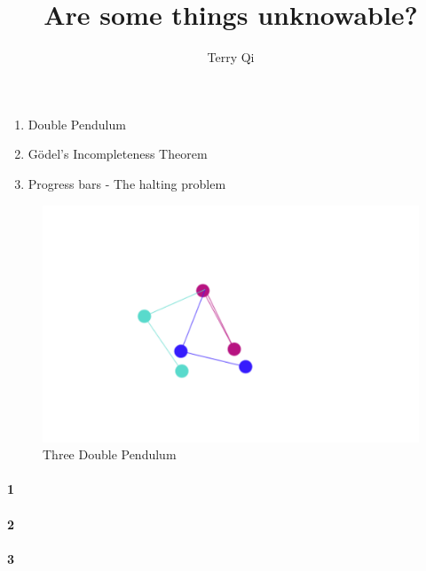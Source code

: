 \documentclass[a4paper,12pt]{article}
\title{Are some things unknowable?}
\author{Terry Qi}
\begin{document}
\maketitle
\begin{enumerate}
 \item Double Pendulum
 \item G\"odel's Incompleteness Theorem
 \item Progress bars - The halting problem
\end{enumerate}

\begin{figure}[h!]
 \centering
 \includegraphics[scale=0.25]{dpend.png}
 \caption{Three Double Pendulum}
\end{figure}



\newpage

\paragraph{1}
\paragraph{2}
\paragraph{3}
\end{document}
